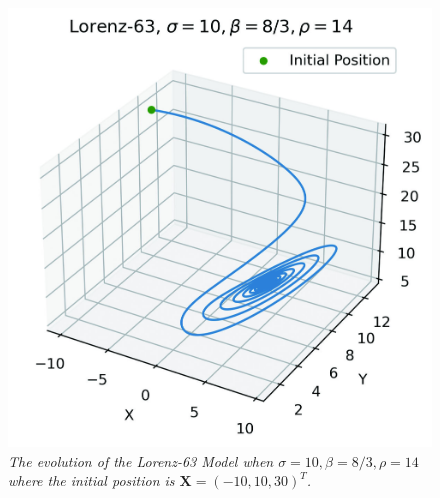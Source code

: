 \begin{figure}[ht!]
    \centering
    \includegraphics[scale=0.8]{graphics/Lorenz63_14.jpg}
    \caption{\textit{The evolution of the Lorenz-63 Model when $\sigma=10, \beta=8/3, \rho=14$ where the initial position is $\textbf{X} = (-10,10,30)^T$.}}
    \label{fig:lor63r14}
\end{figure}
